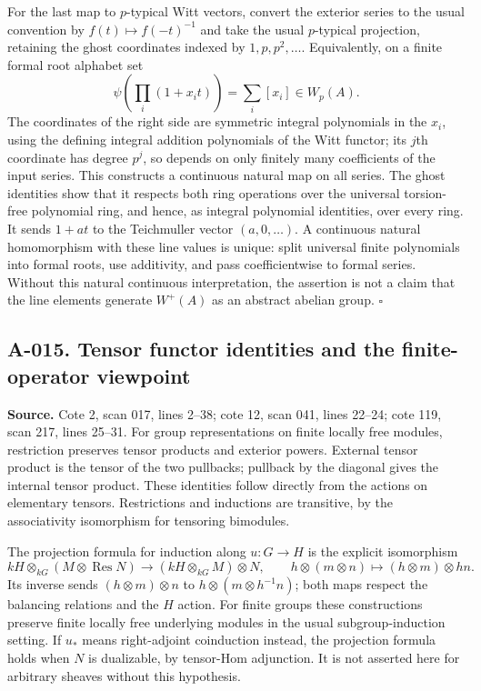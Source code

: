 For the last map to $p$-typical Witt vectors, convert the exterior
series to the usual convention by $f(t)\mapsto f(-t)^{-1}$ and
take the usual $p$-typical projection, retaining the ghost coordinates
indexed by $1,p,p^2,\ldots$. Equivalently, on a finite formal root
alphabet set
\[
 \psi\left(\prod_i(1+x_it)\right)=\sum_i[x_i]\in W_p(A).
\]
The coordinates of the right side are symmetric integral
polynomials in the $x_i$, using the defining integral addition
polynomials of the Witt functor; its $j$th coordinate has degree
$p^j$, so depends on only finitely many coefficients of the input
series. This constructs a continuous natural map on all series.
The ghost identities show that it respects both ring operations
over the universal torsion-free polynomial ring, and hence, as
integral polynomial identities, over every ring. It sends
$1+at$ to the Teichmuller vector $(a,0,\ldots)$. A continuous
natural homomorphism with these line values is unique: split
universal finite polynomials into formal roots, use additivity,
and pass coefficientwise to formal series. Without this natural
continuous interpretation, the assertion is not a claim that the
line elements generate $W^+(A)$ as an abstract abelian group.
\hfill$\square$

\subsection*{A-015. Tensor functor identities and the finite-operator viewpoint}
\textbf{Source.} Cote 2, scan 017, lines 2--38; cote 12, scan 041,
lines 22--24; cote 119, scan 217, lines 25--31.
For group representations on finite locally free modules,
restriction preserves tensor products and exterior powers. External
tensor product is the tensor of the two pullbacks; pullback by the
diagonal gives the internal tensor product. These identities follow
directly from the actions on elementary tensors. Restrictions and
inductions are transitive, by the associativity isomorphism for
tensoring bimodules.

The projection formula for induction along $u:G\to H$ is the explicit
isomorphism
\[
 kH\otimes_{kG}(M\otimes\operatorname{Res}N)
 \longrightarrow(kH\otimes_{kG}M)\otimes N,
 \qquad h\otimes(m\otimes n)\longmapsto(h\otimes m)\otimes hn.
\]
Its inverse sends $(h\otimes m)\otimes n$ to
$h\otimes(m\otimes h^{-1}n)$; both maps respect the balancing
relations and the $H$ action. For finite groups these constructions
preserve finite locally free underlying modules in the usual
subgroup-induction setting. If $u_*$ means right-adjoint
coinduction instead, the projection formula holds when $N$ is
dualizable, by tensor-Hom adjunction. It is not asserted here for
arbitrary sheaves without this hypothesis.

